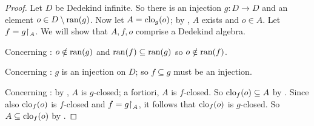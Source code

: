 \documentclass[../../../include/open-logic-section]{subfiles}
\begin{document}
\begin{proof}
Let $D$ be Dedekind infinite. So there is an injection $g \colon D \to
D$ and an element $o  \in D \setminus \mathrm{ran}(g)$. Now let $A =
\mathrm{clo}_{g}(o)$; by , $A$ exists and $o \in A$. Let $f =
g\mathord{\restriction}_{A}$. We will show that $A, f, o$ comprise a Dedekind
algebra. 

Concerning : $o \notin \mathrm{ran}(g)$ and $\mathrm{ran}(f)
\subseteq \mathrm{ran}(g)$ so $o\notin \mathrm{ran}(f)$.

Concerning : $g$ is an injection on $D$; so $f
\subseteq g$ must be an injection.

Concerning : by , $A$ is $g$-closed; a fortiori, $A$ is $f$-closed. So $\mathrm{clo}_{f}(o) \subseteq A$ by . Since also $\mathrm{clo}_{f}(o)$ is $f$-closed and $f = g\mathord{\restriction}_{A}$, it follows that $\mathrm{clo}_{f}(o)$ is $g$-closed. So $A \subseteq \mathrm{clo}_{f}(o)$ by .
\end{proof}
\end{document}
